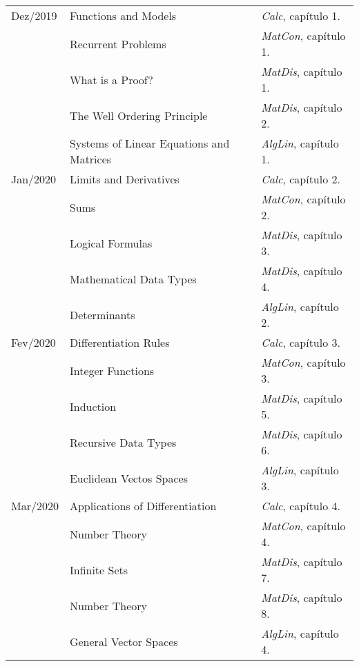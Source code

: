 \documentclass[a4paper]{inzane_syllabus} %
\begin{document}
\begin{center}
\begin{tabularx}{\textwidth}{p{2cm}p{8cm}p{9.5cm}} %
\arrayrulecolor{myCOLOR}\hline
\multicolumn{3}{l}{\textbf{\textcolor{myCOLOR}{\large MÓDULO 1: Base Matemática }}} \\
\hline
Dez/2019 & Functions and Models                     & \emph{Calc},   capítulo 1. \\
         & Recurrent Problems                       & \emph{MatCon}, capítulo 1. \\
         & What is a Proof?                         & \emph{MatDis}, capítulo 1. \\
         & The Well Ordering Principle              & \emph{MatDis}, capítulo 2. \\
         & Systems of Linear Equations and Matrices & \emph{AlgLin}, capítulo 1. \\

\arrayrulecolor{maingray}\hline
Jan/2020 & Limits and Derivatives      & \emph{Calc},   capítulo 2. \\
         & Sums                        & \emph{MatCon}, capítulo 2. \\
         & Logical Formulas            & \emph{MatDis}, capítulo 3. \\
         & Mathematical Data Types     & \emph{MatDis}, capítulo 4. \\
         & Determinants                & \emph{AlgLin}, capítulo 2. \\

\arrayrulecolor{maingray}\hline
Fev/2020 & Differentiation Rules       & \emph{Calc},   capítulo 3. \\
         & Integer Functions           & \emph{MatCon}, capítulo 3. \\
         & Induction                   & \emph{MatDis}, capítulo 5. \\
         & Recursive Data Types        & \emph{MatDis}, capítulo 6. \\
         & Euclidean Vectos Spaces     & \emph{AlgLin}, capítulo 3. \\

\arrayrulecolor{maingray}\hline
Mar/2020 & Applications of Differentiation  & \emph{Calc},   capítulo 4. \\
         & Number Theory                    & \emph{MatCon}, capítulo 4. \\
         & Infinite Sets                    & \emph{MatDis}, capítulo 7. \\
         & Number Theory                    & \emph{MatDis}, capítulo 8. \\
         & General Vector Spaces            & \emph{AlgLin}, capítulo 4. \\


\end{tabularx}
\end{center}
\end{document}
